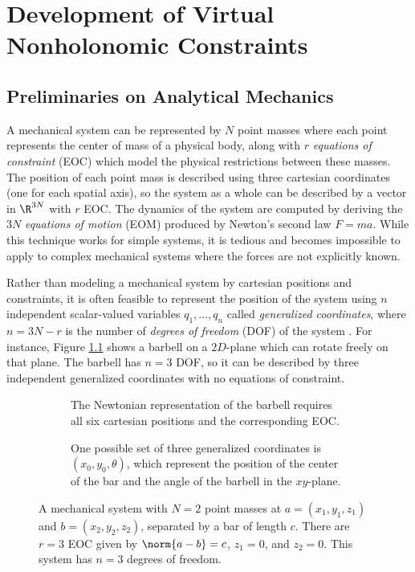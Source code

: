 

\chapter{Development of Virtual Nonholonomic Constraints}\label{ch:vnhcs}

\section{Preliminaries on Analytical Mechanics}
A mechanical system can be represented by \(N\) point masses where each point
represents the center of mass of a physical body, along with \(r\)
\textit{equations of constraint} (EOC) which model the physical restrictions
between these masses.
The position of each point mass is described using three cartesian coordinates (one
for each spatial axis), so the system as a whole can be described by a vector in
\(\R^{3N}\) with \(r\) EOC. 
The dynamics of the system are computed by deriving the \(3N\)
\textit{equations of motion} (EOM) produced by Newton's second law \(F = m a\).
While this technique works for simple systems, it is tedious and becomes
impossible to apply to complex mechanical systems where the forces are not
explicitly known. 

Rather than modeling a mechanical system by cartesian positions and constraints,
it is often feasible to represent the position of the system using \(n\)
independent scalar-valued variables \(q_1,\ldots,q_n\) called 
\textit{generalized coordinates}, where \(n = 3N - r\) is the number of
\textit{degrees of freedom} (DOF) of the system \cite{greenwood_dynamics}. For
instance, Figure \ref{fig:barbell} shows a barbell on a \(2D\)-plane which can
rotate freely on that plane. 
The barbell has \(n = 3\) DOF, so it can be described by three
independent generalized coordinates with no equations of constraint.

\begin{figure}
   \centering
   \begin{subfigure}[]{0.75\textwidth}
      
      \caption{The Newtonian representation of the barbell 
      requires all six cartesian positions and the corresponding EOC.}
   \end{subfigure}
   \begin{subfigure}[]{0.75\textwidth}
      
      \caption{One possible set of three generalized coordinates is
       \((x_0,y_0,\theta)\), which represent the position of the 
       center of the bar and the angle of the barbell in the \(xy\)-plane.}
   \end{subfigure}
   \caption{A mechanical system with \(N = 2\) point masses at \(a = (x_1,y_1,z_1)\)
       and \(b = (x_2,y_2,z_2)\), separated by a bar of length \(c\). 
       There are \(r = 3\) EOC given by \(\norm{a - b} = c\), \(z_1 = 0\),
       and \(z_2 = 0\). This system has \(n = 3\) degrees of freedom.}
   \label{fig:barbell}
\end{figure}

